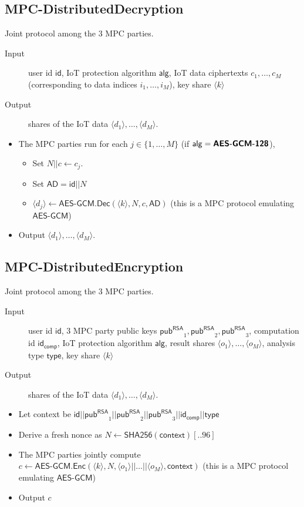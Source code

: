 \documentclass[10pt,a4paper]{article}
\newcommand{\pub}{\ensuremath{\mathsf{pub}}}
\newcommand{\pubRSA}{\ensuremath{\pub^{\mathsf{RSA}}}}
\newcommand{\id}{\ensuremath{\mathsf{id}}}
\newcommand{\idcomp}{\ensuremath{\mathsf{id}_{\mathsf{comp}}}}
\newcommand{\type}{\ensuremath{\mathsf{type}}}
\newcommand{\alg}{\ensuremath{\mathsf{alg}}}
\newcommand{\share}[1]{\ensuremath{\langle #1 \rangle}}
\newcommand{\AlgAESGCM}{\textsf{\textbf{AES-GCM-128}}}
\newcommand{\AESGCM}{\ensuremath{\textsf{AES-GCM}}}
\newcommand{\Encrypt}{\ensuremath{\textsf{Enc}}}
\newcommand{\Decrypt}{\ensuremath{\textsf{Dec}}}
\newcommand{\hash}{\ensuremath{\textsf{SHA256}}}
\begin{document}
\subsection{MPC-DistributedDecryption}
Joint protocol among the 3 MPC parties.
\begin{description}
	\item[Input] user id $\id$, IoT protection algorithm $\alg$, IoT data ciphertexts $c_1, \dots, c_M$ (corresponding to data indices $i_1, \dots, i_M$), key share $\share{k}$
	\item[Output] shares of the IoT data $\share{d_1}, \dots, \share{d_M}$.
\end{description}
\begin{itemize}
	\item The MPC parties run for each $j \in \{1, \dots, M\}$ (if $\alg = \AlgAESGCM$),
	\begin{itemize}
		\item Set $N||c \gets c_j$.
		\item Set $\mathsf{AD} = \id||N$
		\item $\share{d_j} \gets \AESGCM.\Decrypt(\share{k},N,c,\mathsf{AD})$ (this is a MPC protocol emulating $\AESGCM$)
	\end{itemize}
	\item Output $\share{d_1}, \dots, \share{d_M}$.
\end{itemize}

\subsection{MPC-DistributedEncryption}
Joint protocol among the 3 MPC parties.
\begin{description}
	\item[Input] user id $\id$, 3 MPC party public keys $\pubRSA_1, \pubRSA_2, \pubRSA_3$, computation id $\idcomp$, IoT protection algorithm $\alg$, result shares $\share{o_1}, \dots, \share{o_M}$, analysis type $\type$, key share $\share{k}$
	\item[Output] shares of the IoT data $\share{d_1}, \dots, \share{d_M}$.
\end{description}
\begin{itemize}
	\item Let context be $\id||\pubRSA_1||\pubRSA_2||\pubRSA_3||\idcomp||\type$
	\item Derive a fresh nonce as $N \gets \hash(\mathsf{context})[..96]$
	\item The MPC parties jointly compute $c \gets \AESGCM.\Encrypt(\share{k}, N, \share{o_1}||\dots||\share{o_M}, \mathsf{context})$ (this is a MPC protocol emulating $\AESGCM$)
	\item Output $c$
\end{itemize}
\end{document}
